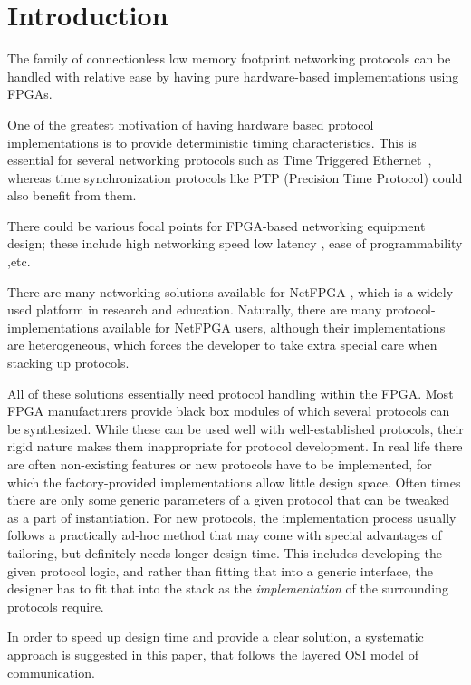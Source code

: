 \documentclass[conference]{IEEEtran}
\begin{document}

\section{Introduction}\label{sec:Motivation}

The family of connectionless low memory footprint networking protocols can be handled with relative ease by having pure
hardware-based implementations using FPGAs.

One of the greatest motivation of having hardware based protocol implementations is to provide deterministic timing
characteristics. This is essential for several networking protocols such as Time Triggered Ethernet~\cite{SAE_AS6802},
whereas time synchronization protocols like PTP (Precision Time Protocol) \cite{PTP_standard}could also benefit from
them.

There could be various focal points for FPGA-based networking equipment design; these include high networking speed
\cite{C-GEP_HPSR} low latency \cite{related:TrustNode}, ease of programmability \cite{C-Board_NEMA},etc.

There are many networking solutions available for NetFPGA \cite{NetFPGA}, which is a widely used platform
in research and education. Naturally, there are many protocol-implementations available for NetFPGA users, although
their implementations are heterogeneous, which forces the developer to take extra special care when stacking up
protocols.

All of these solutions essentially need protocol handling within the FPGA. Most FPGA manufacturers provide black box
modules of which several protocols can be synthesized. While these can be used well with well-established protocols,
their rigid nature makes them inappropriate for protocol development.
In real life there are often non-existing features
or new protocols have to be implemented, for which the factory-provided implementations allow little design space.
Often times there are only some generic parameters of a given protocol that can be tweaked as a part of instantiation.
For new protocols, the implementation process usually follows a practically ad-hoc method that may come with special
advantages of tailoring, but definitely needs longer design time.
This includes developing the given protocol logic, and rather than fitting that into a generic interface,
the designer has to fit that into the stack as the \emph{implementation} of the surrounding protocols require.

In order to speed up design time and provide a clear solution, a systematic approach is suggested in this paper,
that follows the layered OSI model of communication.
\end{document}
